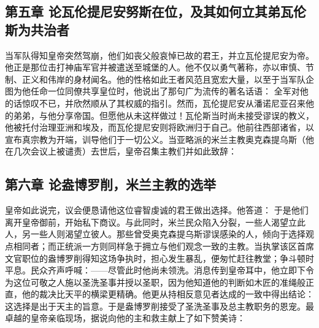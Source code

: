 \subsection{第五章 论瓦伦提尼安努斯在位，及其如何立其弟瓦伦斯为共治者}

当军队得知皇帝突然驾崩，他们如丧父般哀悼已故的君王，并立瓦伦提尼安为帝。他正是那位击打神庙军官并被遣送至城堡的人。他不仅以勇气著称，亦以审慎、节制、正义和伟岸的身材闻名。他的性格如此王者风范且宽宏大量，以至于当军队企图为他任命一位同僚共享皇位时，他说出了那句广为流传的著名话语： 全军对他的话惊叹不已，并欣然顺从了其权威的指引。然而，瓦伦提尼安从潘诺尼亚召来他的弟弟，与他分享帝国。但愿他从未这样做过！瓦伦斯当时尚未接受谬误的教义，他被托付治理亚洲和埃及，而瓦伦提尼安则将欧洲归于自己。他前往西部诸省，以宣布真宗教为开端，训导他们于一切公义。当亚略派的米兰主教奥克森提乌斯（他在几次会议上被谴责）去世后，皇帝召集主教们并如此致辞：\par


\subsection{第六章 论盎博罗削，米兰主教的选举}

皇帝如此说完，议会便恳请他这位睿智虔诚的君王做出选择。他答道： 于是他们离开皇帝御前，开始私下商议。与此同时，米兰民众陷入分裂，一些人渴望立此人，另一些人则渴望立彼人。那些曾受奥克森提乌斯谬误感染的人，倾向于选择观点相同者；而正统派一方则同样急于拥立与他们观念一致的主教。当执掌该区首席文官职位的盎博罗削得知这场争执时，担心发生暴乱，便匆忙赶往教堂；争斗顿时平息。民众齐声呼喊：——尽管此时他尚未领洗。消息传到皇帝耳中，他立即下令为这位可敬之人施以圣洗圣事并授以圣职，因为他知道他的判断如木匠的准绳般正直，他的裁决比天平的横梁更精确。他更从持相反意见者达成的一致中得出结论：这选择是出于天主的旨意。于是盎博罗削接受了圣洗圣事及总主教职务的恩宠。最卓越的皇帝亲临现场，据说向他的主和救主献上了如下赞美诗：\par

